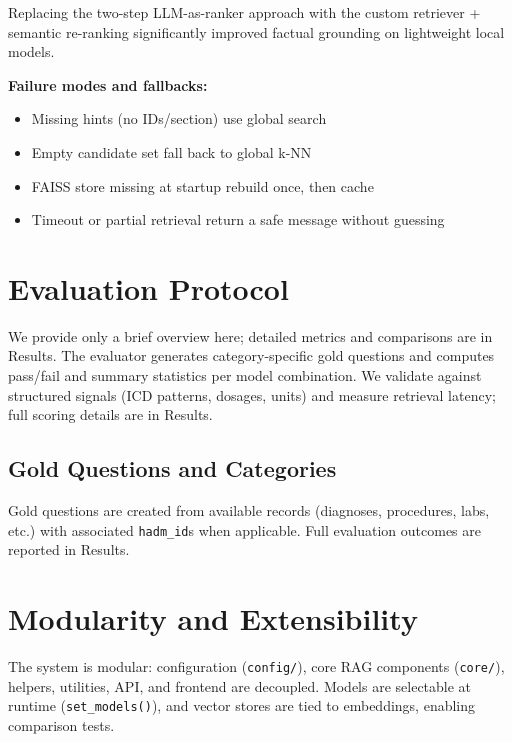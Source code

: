 \noindent Replacing the two-step LLM-as-ranker approach with the custom retriever + semantic re-ranking significantly improved factual grounding on lightweight local models.

\noindent \textbf{Failure modes and fallbacks:}
\begin{itemize}
  \item Missing hints (no IDs/section) \textrightarrow{} use global search
  \item Empty candidate set \textrightarrow{} fall back to global k-NN
  \item FAISS store missing at startup \textrightarrow{} rebuild once, then cache
  \item Timeout or partial retrieval \textrightarrow{} return a safe message without guessing
\end{itemize}

\section{Evaluation Protocol}
We provide only a brief overview here; detailed metrics and comparisons are in Results. The evaluator generates category-specific gold questions and computes pass/fail and summary statistics per model combination. We validate against structured signals (ICD patterns, dosages, units) and measure retrieval latency; full scoring details are in Results.

\subsection{Gold Questions and Categories}
Gold questions are created from available records (diagnoses, procedures, labs, etc.) with associated \texttt{hadm\_id}s when applicable. Full evaluation outcomes are reported in Results.

\section{Modularity and Extensibility}
The system is modular: configuration (\texttt{config/}), core RAG components (\texttt{core/}), helpers, utilities, API, and frontend are decoupled. Models are selectable at runtime (\texttt{set\_models()}), and vector stores are tied to embeddings, enabling comparison tests.

